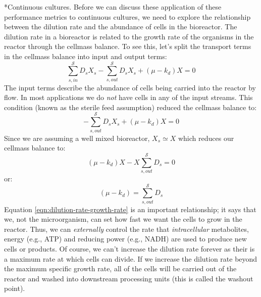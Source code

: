 \documentclass[11pt]{article}
\makeatletter
\theoremstyle{definition}
\renewcommand\subsubsection{\@startsection
	{subsubsection}{2}{0mm}
	{-0.05in}
	{-0.5\baselineskip}
	{\normalfont\normalsize\itshape}}
\makeatother
\begin{document}
\subsubsection*{Continuous cultures.}
Before we can discuss these application of these performance metrics to continuous cultures,
we need to explore the relationship between the dilution rate and the abundance of cells in the bioreactor.
The dilution rate in a bioreactor is related to the growth rate of the organisms in the reactor through the cellmass balance.
To see this, let's split the transport terms in the cellmass balance into input and output terms:
\begin{equation}
	\sum_{s,in}^{\mathcal{S}}D_{s}X_{s} - \sum_{s,out}^{\mathcal{S}}D_{s}X_{s}+\left(\mu - k_{d}\right)X = 0
\end{equation}The input terms describe the abundance of cells being carried into the reactor by flow. In most applications we do \textit{not} have cells in any of the input streams.
This condition (known as the sterile feed assumption) reduced the cellmass balance to:
\begin{equation}
	- \sum_{s,out}^{\mathcal{S}}D_{s}X_{s}+\left(\mu - k_{d}\right)X = 0
\end{equation}Since we are assuming a well mixed bioreactor, $X_{s}\simeq{X}$ which reduces our cellmass balance to:
\begin{equation}
	\left(\mu - k_{d}\right)X - X\sum_{s,out}^{\mathcal{S}}D_{s} = 0
\end{equation}or:
\begin{equation}\label{eqn:dilution-rate-growth-rate}
	\left(\mu - k_{d}\right) = \sum_{s,out}^{\mathcal{S}}D_{s}
\end{equation}
Equation \eqref{eqn:dilution-rate-growth-rate} is an important relationship; it says that we, not the microorganism, can set how fast we want the cells to grow in the reactor.
Thus, we can \textit{externally} control the rate that \textit{intracellular} metabolites, energy (e.g., ATP) and reducing power (e.g., NADH) are used to produce new cells or products.
Of course, we can't increase the dilution rate forever as their is a maximum rate at which cells can divide. If we increase the dilution rate beyond the maximum specific growth rate, all of the cells will be carried out of the reactor and washed into downstream processing units (this is called the washout point).
\end{document}
